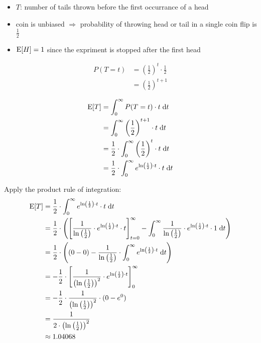 \begin{itemize}
\item $T$: number of tails thrown before the first occurrance of a head
\item coin is unbiased $\Rightarrow$ probability of throwing head or tail in a single coin flip is $\frac{1}{2}$
\item $\mathrm{E}[H] = 1$ since the expriment is stopped after the first head
\end{itemize}

\begin{align*}
P(T=t) &= \left(\frac{1}{2}\right)^t \cdot \frac{1}{2} \\
       &= \left(\frac{1}{2}\right)^{t+1}
\end{align*}


\begin{align*}
\mathrm{E}[T] &= \int_0^\infty P(T=t) \cdot t \;\mathrm{d} t \\
      &= \int_0^\infty \left(\frac{1}{2}\right)^{t+1} \cdot t \;\mathrm{d} t \\
      &= \frac{1}{2} \cdot \int_0^\infty \left(\frac{1}{2}\right)^t \cdot t \;\mathrm{d} t \\
      &= \frac{1}{2} \cdot \int_0^\infty e^{\ln\left(\frac{1}{2}\right) \cdot t} \cdot t \;\mathrm{d} t \\
\end{align*}

Apply the product rule of integration:
\begin{align*}
\mathrm{E}[T] &= \frac{1}{2} \cdot \int_0^\infty e^{\ln\left(\frac{1}{2}\right) \cdot t} \cdot t \;\mathrm{d} t \\
      &= \frac{1}{2} \cdot \left( \left[ \frac{1}{\ln \left( \frac{1}{2} \right)} \cdot e^{\ln\left(\frac{1}{2}\right) \cdot t} \cdot t \right]_{t=0}^\infty - \int_0^\infty \frac{1}{\ln\left(\frac{1}{2}\right)} \cdot e^{\ln\left(\frac{1}{2}\right) \cdot t} \cdot 1 \;\mathrm{d} t \right) \\
      &= \frac{1}{2} \cdot \left((0-0) - \frac{1}{\ln\left(\frac{1}{2}\right)} \cdot \int_0^\infty e^{\ln\left(\frac{1}{2}\right) \cdot t} \;\mathrm{d} t \right) \\
      &= - \frac{1}{2} \cdot \left[ \frac{1}{\left( \ln \left( \frac{1}{2} \right) \right)^2} \cdot e^{\ln\left(\frac{1}{2}\right) \cdot t} \right]_0^\infty \\
      &= - \frac{1}{2} \cdot \frac{1}{\left( \ln \left( \frac{1}{2} \right) \right)^2} \cdot (0 - e^0) \\
      &= \frac{1}{2 \cdot \left( \ln \left( \frac{1}{2} \right) \right)^2} \\
      &\approx 1.04068
\end{align*}
